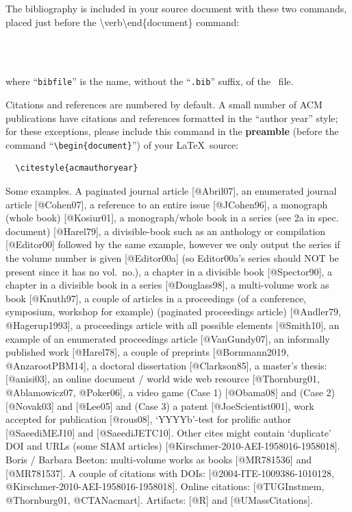 \documentclass[
  letterpaper,
  DIV=11,
  numbers=noendperiod]{scrartcl}
\begin{document}
The bibliography is included in your source document with these two
commands, placed just before the
\textbackslash verb\textbar\textbackslash end\{document\}\textbar{}
command:

\begin{verbatim}
  
  
\end{verbatim}

where ``\texttt{bibfile}'' is the name, without the ``\texttt{.bib}''
suffix, of the \BibTeX~file.

Citations and references are numbered by default. A small number of ACM
publications have citations and references formatted in the ``author
year'' style; for these exceptions, please include this command in the
\textbf{preamble} (before the command
``\texttt{\textbackslash{}begin\{document\}}'') of your \LaTeX~source:

\begin{verbatim}
  \citestyle{acmauthoryear}
\end{verbatim}

Some examples. A paginated journal article {[}@Abril07{]}, an enumerated
journal article {[}@Cohen07{]}, a reference to an entire issue
{[}@JCohen96{]}, a monograph (whole book) {[}@Kosiur01{]}, a
monograph/whole book in a series (see 2a in spec. document)
{[}@Harel79{]}, a divisible-book such as an anthology or compilation
{[}@Editor00{]} followed by the same example, however we only output the
series if the volume number is given {[}@Editor00a{]} (so Editor00a's
series should NOT be present since it has no vol.~no.), a chapter in a
divisible book {[}@Spector90{]}, a chapter in a divisible book in a
series {[}@Douglass98{]}, a multi-volume work as book {[}@Knuth97{]}, a
couple of articles in a proceedings (of a conference, symposium,
workshop for example) (paginated proceedings article) {[}@Andler79,
@Hagerup1993{]}, a proceedings article with all possible elements
{[}@Smith10{]}, an example of an enumerated proceedings article
{[}@VanGundy07{]}, an informally published work {[}@Harel78{]}, a couple
of preprints {[}@Bornmann2019, @AnzarootPBM14{]}, a doctoral
dissertation {[}@Clarkson85{]}, a master's thesis: {[}@anisi03{]}, an
online document / world wide web resource {[}@Thornburg01,
@Ablamowicz07, @Poker06{]}, a video game (Case 1) {[}@Obama08{]} and
(Case 2){[}@Novak03{]} and {[}@Lee05{]} and (Case 3) a patent
{[}@JoeScientist001{]}, work accepted for publication {[}@rous08{]},
`YYYYb'-test for prolific author {[}@SaeediMEJ10{]} and
{[}@SaeediJETC10{]}. Other cites might contain `duplicate' DOI and URLs
(some SIAM articles) {[}@Kirschmer-2010-AEI-1958016-1958018{]}. Boris /
Barbara Beeton: multi-volume works as books {[}@MR781536{]} and
{[}@MR781537{]}. A couple of citations with DOIs:
{[}@2004-ITE-1009386-1010128, @Kirschmer-2010-AEI-1958016-1958018{]}.
Online citations: {[}@TUGInstmem, @Thornburg01, @CTANacmart{]}.
Artifacts: {[}@R{]} and {[}@UMassCitations{]}.
\end{document}
